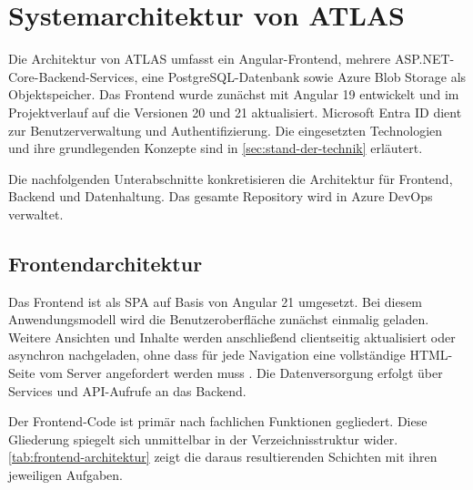 \section{Systemarchitektur von ATLAS}
Die Architektur von \ac{ATLAS} umfasst ein Angular-Frontend, mehrere ASP.NET-Core-Backend-Services, eine PostgreSQL-Datenbank sowie Azure Blob Storage als Objektspeicher. Das Frontend wurde zunächst mit Angular 19 entwickelt und im Projektverlauf auf die Versionen 20 und 21 aktualisiert. Microsoft Entra ID dient zur Benutzerverwaltung und Authentifizierung. Die eingesetzten Technologien und ihre grundlegenden Konzepte sind in \autoref{sec:stand-der-technik} erläutert.

Die nachfolgenden Unterabschnitte konkretisieren die Architektur für Frontend, Backend und Datenhaltung. Das gesamte Repository wird in Azure DevOps verwaltet.


\subsection{Frontendarchitektur}
Das Frontend ist als \ac{SPA} auf Basis von Angular 21 umgesetzt. Bei diesem Anwendungsmodell wird die Benutzeroberfläche zunächst einmalig geladen. Weitere Ansichten und Inhalte werden anschließend clientseitig aktualisiert oder asynchron nachgeladen, ohne dass für jede Navigation eine vollständige \ac{HTML}-Seite vom Server angefordert werden muss \cite{MesbahVanDeursen2007}. Die Datenversorgung erfolgt über Services und \ac{API}-Aufrufe an das Backend.

Der Frontend-Code ist primär nach fachlichen Funktionen gegliedert. Diese Gliederung spiegelt sich unmittelbar in der Verzeichnisstruktur wider. \autoref{tab:frontend-architektur} zeigt die daraus resultierenden Schichten mit ihren jeweiligen Aufgaben.

